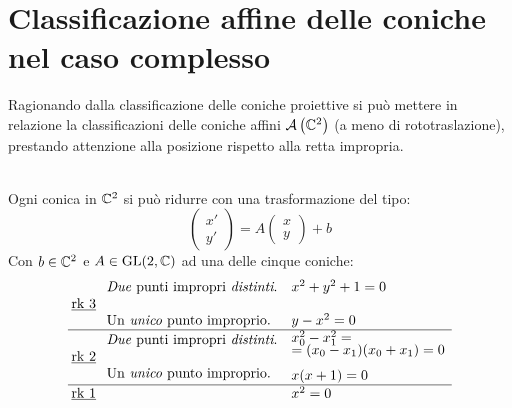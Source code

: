 \section{Classificazione affine delle coniche nel caso complesso}
Ragionando dalla classificazione delle coniche proiettive si può mettere in relazione la classificazioni delle coniche affini ${\mathcal{A}\left(\mathbb{C}^2\right)}$ (a meno di rototraslazione), prestando attenzione alla posizione rispetto alla retta impropria.
\begin{proposition}~{}\\
Ogni conica in $\mathbb{C}^2$ si può ridurre con una trasformazione del tipo:
\begin{equation}
	\begin{pmatrix} x' \\ y' \end{pmatrix} =A\begin{pmatrix} x \\ y \end{pmatrix} +b
\end{equation}
Con $b\in\mathbb{C}^2$ e $A\in\operatorname{GL}(2,\mathbb{C})$ ad una delle cinque coniche:
\begin{equation*}
	\arraycolsep=2.5pt
	\begin{array}{ccl}
		\underline{\rk 3} & \begin{array}{l}
			\text{\textit{Due} punti impropri \textit{distinti}.} \\
			\\
			\text{Un \textit{unico} punto improprio.}
		\end{array} & \begin{array}{l}
			x^2+y^2+1=0\\
			\\
			y-x^2=0\\
		\end{array}
		\\\hline %
		\underline{\rk 2} & \begin{array}{l}
			\text{\textit{Due} punti impropri \textit{distinti}.} \\
			\\
			\text{Un \textit{unico} punto improprio.}
		\end{array} & \begin{array}{l}
			x_0^2-x_1^2=\\[-0.75ex]
			=(x_0-x_1)(x_0+x_1)=0
			\\[-1mm]
			\\[-1mm]
			x(x+1)=0
		\end{array}\\[2mm] \hline %
		\underline{\rk 1} & ~ & \begin{array}{l}
			\\[-4mm]
			x^2=0
		\end{array}
	\end{array}	
\end{equation*}
\vspace{-3mm}
\end{proposition}

